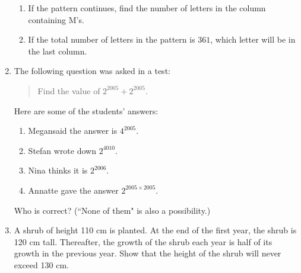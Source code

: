 \begin{enumerate}
{\begin{enumerate}
\item{If the pattern continues, find the number of letters in the column containing M's.}
\item{If the total number of letters in the pattern is $361$, which letter will be in the last column.}
\end{enumerate}}

\item{The following question was asked in a test:
\begin{quote}
Find the value of $2^{2005} + 2^{2005}$.
\end{quote}
Here are some of the students' answers:\\
\begin{enumerate}
\item Megansaid the answer is $4^{2005}$.
\item Stefan wrote down $2^{4010}$.
\item Nina thinks it is $2^{2006}$.
\item Annatte gave the answer $2^{2005 \times 2005}$.
\end{enumerate}
Who is correct? (``None of them" is also a possibility.)}

\item{A shrub of height 110 cm is planted. At the end of the first year, the shrub is 120 cm tall. Thereafter, the growth of the shrub each year is half of its growth in the previous year. Show that the height of the shrub will never exceed 130 cm.}

\end{enumerate}







